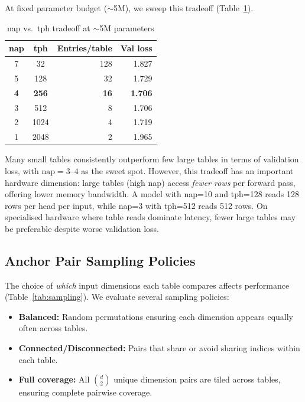 \documentclass[11pt]{article}
\begin{document}
At fixed parameter budget ($\sim$5M), we sweep this tradeoff (Table~\ref{tab:nap_tph}).

\begin{table}[!t]
\caption{nap vs.\ tph tradeoff at $\sim$5M parameters}
\label{tab:nap_tph}
\centering
\begin{tabular}{ccrr}
\toprule
nap & tph & Entries/table & Val loss \\
\midrule
7  & 32   & 128 & 1.827 \\
5  & 128  & 32  & 1.729 \\
\textbf{4}  & \textbf{256}  & \textbf{16}  & \textbf{1.706} \\
3  & 512  & 8   & 1.706 \\
2  & 1024 & 4   & 1.719 \\
1  & 2048 & 2   & 1.965 \\
\bottomrule
\end{tabular}
\end{table}

Many small tables consistently outperform few large tables in terms of validation loss, with $\mathrm{nap} = 3\text{--}4$ as the sweet spot.
However, this tradeoff has an important hardware dimension: large tables (high nap) access \emph{fewer rows} per forward pass, offering lower memory bandwidth.
A model with nap=10 and tph=128 reads 128 rows per head per input, while nap=3 with tph=512 reads 512 rows.
On specialised hardware where table reads dominate latency, fewer large tables may be preferable despite worse validation loss.

\subsection{Anchor Pair Sampling Policies}
\label{sec:sampling}

The choice of \emph{which} input dimensions each table compares affects performance (Table~\ref{tab:sampling}).
We evaluate several sampling policies:
\begin{itemize}
    \item \textbf{Balanced:} Random permutations ensuring each dimension appears equally often across tables.
    \item \textbf{Connected/Disconnected:} Pairs that share or avoid sharing indices within each table.
    \item \textbf{Full coverage:} All $\binom{d}{2}$ unique dimension pairs are tiled across tables, ensuring complete pairwise coverage.
\end{itemize}
\end{document}
